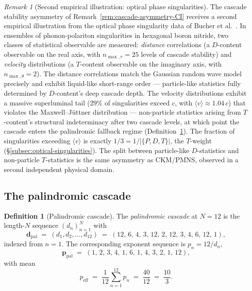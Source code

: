 \documentclass[11pt,a4paper]{article}
\theoremstyle{definition}
\newtheorem{definition}[theorem]{Definition}
\theoremstyle{remark}
\newtheorem{remark}[theorem]{Remark}
\begin{document}
\begin{remark}[Second empirical illustration: optical phase singularities]\label{rem:bucher-cascade}
The cascade stability asymmetry of Remark~\ref{rem:cascade-asymmetry-CI} receives a second empirical illustration from the optical phase singularity data of Bucher et al.~\cite{Bucher2025}. In ensembles of phonon-polariton singularities in hexagonal boron nitride, two classes of statistical observable are measured: \emph{distance} correlations (a $D$-content observable on the real axis, with $n_{\max,r}=25$ levels of cascade stability) and \emph{velocity} distributions (a $T$-content observable on the imaginary axis, with $n_{\max,\theta}=2$). The distance correlations match the Gaussian random wave model precisely and exhibit liquid-like short-range order --- particle-like statistics fully determined by $D$-content's deep cascade depth. The velocity distributions exhibit a massive superluminal tail ($29\%$ of singularities exceed $c$, with $\langle v\rangle \approx 1.04\,c$) that violates the Maxwell--J\"uttner distribution --- non-particle statistics arising from $T$-content's structural indeterminacy after two cascade levels, at which point the cascade enters the palindromic fallback regime (Definition~\ref{def:palindrome}). The fraction of singularities exceeding $\langle v\rangle$ is exactly $1/3 = 1/|\{P,D,T\}|$, the $T$-weight (\S\ref{subsec:optical-singularities}). The split between particle-like $D$-statistics and non-particle $T$-statistics is the same asymmetry as CKM/PMNS, observed in a second independent physical domain.
\end{remark}

\subsection{The palindromic cascade}

\begin{definition}[Palindromic cascade]\label{def:palindrome}
The \emph{palindromic cascade} at $N=12$ is the length-$N$ sequence $(d_{n})_{n=1}^{N}$ with
\[
\mathbf{d}_{\mathrm{pal}} \;=\; (d_{1},d_{2},\ldots,d_{12}) \;=\; (12,\,6,\,4,\,3,\,12,\,2,\,12,\,3,\,4,\,6,\,12,\,1),
\]
indexed from $n=1$. The corresponding exponent sequence is $p_{n}=12/d_{n}$,
\[
\mathbf{p}_{\mathrm{pal}} \;=\; (1,\,2,\,3,\,4,\,1,\,6,\,1,\,4,\,3,\,2,\,1,\,12),
\]
with mean
\[
p_{\mathrm{eff}} \;=\; \frac{1}{12}\sum_{n=1}^{12}p_{n} \;=\; \frac{40}{12} \;=\; \frac{10}{3}.
\]
\end{definition}
\end{document}
